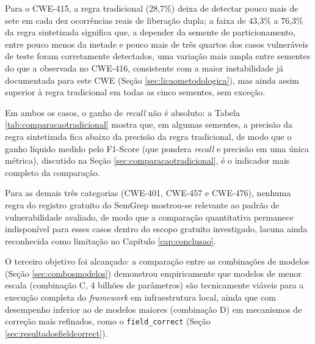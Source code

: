 \documentclass[
    12pt,                %
    openright,           %
    oneside,             %
    a4paper,             %
    english,             %
    brazil               %
]{abntex2}
\begin{document}
\par
Para o CWE-415, a regra tradicional (28,7\%) deixa de detectar pouco mais de sete em cada dez ocorrências reais de liberação dupla; a faixa de 43,3\% a 76,3\% da regra sintetizada significa que, a depender da semente de particionamento, entre pouco menos da metade e pouco mais de três quartos dos casos vulneráveis de teste foram corretamente detectados, uma variação mais ampla entre sementes do que a observada no CWE-416, consistente com a maior instabilidade já documentada para este CWE (Seção \ref{sec:licaometodologica}), mas ainda assim superior à regra tradicional em todas as cinco sementes, sem exceção.
\par
Em ambos os casos, o ganho de \textit{recall} não é absoluto: a Tabela \ref{tab:comparacaotradicional} mostra que, em algumas sementes, a precisão da regra sintetizada fica abaixo da precisão da regra tradicional, de modo que o ganho líquido medido pelo F1-Score (que pondera \textit{recall} e precisão em uma única métrica), discutido na Seção \ref{sec:comparacaotradicional}, é o indicador mais completo da comparação.
\par
Para as demais três categorias (CWE-401, CWE-457 e CWE-476), nenhuma regra do registro gratuito do SemGrep mostrou-se relevante ao padrão de vulnerabilidade avaliado, de modo que a comparação quantitativa permanece indisponível para esses casos dentro do escopo gratuito investigado, lacuna ainda reconhecida como limitação no Capítulo \ref{cap:conclusao}.
\par
O terceiro objetivo foi alcançado: a comparação entre as combinações de modelos (Seção \ref{sec:combosmodelos}) demonstrou empiricamente que modelos de menor escala (combinação C, 4 bilhões de parâmetros) são tecnicamente viáveis para a execução completa do \textit{framework} em infraestrutura local, ainda que com desempenho inferior ao de modelos maiores (combinação D) em mecanismos de correção mais refinados, como o \texttt{field\_correct} (Seção \ref{sec:resultadosfieldcorrect}).
\end{document}
